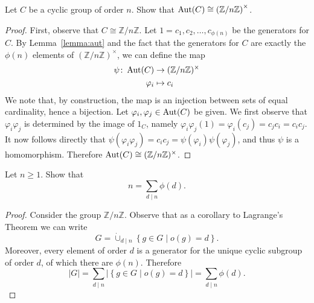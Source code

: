\documentclass[10pt]{amsart}
\begin{document}
\begin{thm}
  Let $C$ be a cyclic group of order $n$.  Show that $\operatorname{Aut}(C) \cong \left(\mathbb{Z}/n\mathbb{Z}\right)^\times$.
  \begin{proof}
    First, observe that $C \cong \mathbb{Z}/n\mathbb{Z}$. Let $1=c_1, c_2, \ldots, c_{\phi(n)}$ be the generators for $C$.  By Lemma~\ref{lemma:aut} and the fact that the generators for $C$ are exactly the $\phi(n)$ elements of $(\mathbb{Z}/n\mathbb{Z})^{\times}$, we can define the map 
    \begin{align*}
      \psi \colon \operatorname{Aut}(C) & \rightarrow (\mathbb{Z}/n\mathbb{Z})^{\times}\\
      \varphi_i & \mapsto c_i
    \end{align*}
    We note that, by construction, the map is an injection between sets of equal cardinality, hence a bijection.
    Let $\varphi_i, \varphi_j \in \operatorname{Aut}(C)$ be given.
    We first observe that $\varphi_i\varphi_j$ is determined by the image of $1_C$, namely $\varphi_i\varphi_j(1) = \varphi_i(c_j) = c_jc_i = c_ic_j$.
    It now follows directly that $\psi(\varphi_i\varphi_j) = c_ic_j = \psi(\varphi_i)\psi(\varphi_j)$, and thus $\psi$ is a homomorphism.
    Therefore $\operatorname{Aut}(C) \cong (\mathbb{Z}/n\mathbb{Z})^{\times}$.
  \end{proof}
\end{thm}

\begin{thm}
  Let $n \geq 1$.  Show that $$n = \sum_{d \mid n} \phi(d).$$
  \begin{proof}
    Consider the group $\mathbb{Z}/n\mathbb{Z}$.  
    Observe that as a corollary to Lagrange's Theorem we can write 
    $$G = \dot{\cup}_{d \mid n} \left\{g \in G \mid o(g) = d\right\}.$$
    Moreover, every element of order $d$ is a generator for the unique cyclic subgroup of order $d$, of which there are $\phi(n).$
    Therefore $$\left| G \right| = \sum_{d \mid n} \left| \left\{g \in G \mid o(g) = d\right\} \right| = \sum_{d \mid n} \phi(d).$$
  \end{proof}
\end{thm}
\end{document}
